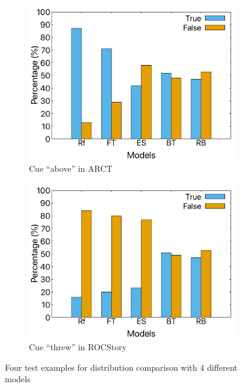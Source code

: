 \begin{figure}[th]
\newpage

\begin{subfigure}[b]{0.49\textwidth}
\centering
\includegraphics[width=\columnwidth]{picture/above-arct.pdf}
\caption{Cue ``above'' in ARCT}
\label{fig:cue_above}
\end{subfigure}
\hfill
\begin{subfigure}[b]{0.49\textwidth}
\centering
\includegraphics[width=\columnwidth]{picture/threw-roc.pdf}
\caption{Cue ``threw'' in ROCStory}
\label{fig:cue_threw}
\end{subfigure}

\caption{Four test examples for distribution comparison with 4 different models}
\label{fig:cue_result}
\end{figure}


